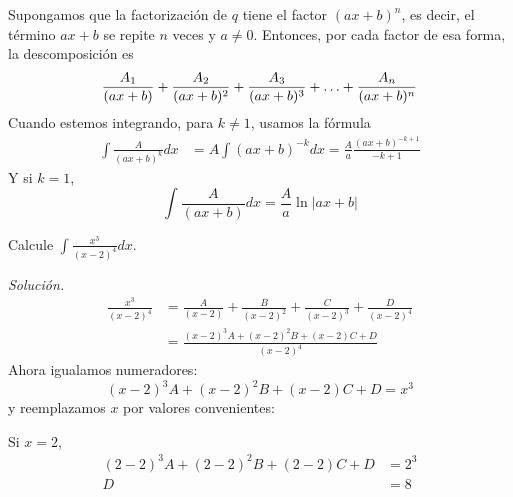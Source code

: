 Supongamos que la factorización de $q$ tiene el factor $(ax+b)^n$, es decir, el término $ax+b$ se repite $n$ veces y $a\ne0$. Entonces, por cada factor de esa forma, la descomposición es
\[
  \frac{A_{1}}{(ax+b)}+\frac{A_{2}}{(ax+b)^{2}}+\frac{%
  A_{3}}{(ax+b)^{3}}+\ldots+\frac{A_{n}}{(ax+b)^{n}}
\]
Cuando estemos integrando, para $k\ne 1$, usamos la fórmula
\begin{align*}
  \int \frac{A}{(ax+b)^{k}}dx&=A\int (ax+b)^{-k}dx
  =\frac{A}{a}\frac{(ax+b)^{-k+1}}{-k+1}
\end{align*}
Y si $k= 1$,
\[
  \int \frac{A}{\left( ax+b\right)}dx=\frac{A}{a}\ln\vert ax+b\vert
\]
\begin{ejemplo}
  Calcule $\int \frac{x^{3}}{(x-2)^{4}}dx$.
\end{ejemplo}
\emph{Solución.} 
\begin{align*}
  \frac{x^{3}}{(x-2)^{4}}&=\frac{A}{(x-2)}+\frac{B}{(x-2)^{2}}+%
  \frac{C}{(x-2)^{3}}+\frac{D}{(x-2)^{4}} \\
  &=\frac{(x-2)^{3}A+(x-2)^{2}B+(x-2)C+D}{(x-2)^{4}}
\end{align*}
Ahora igualamos numeradores:
\begin{equation}\label{Ejem2Fracc}
  (x-2)^{3}A+(x-2)^{2}B+(x-2)C+D=x^{3}
\end{equation}
y reemplazamos $x$ por valores convenientes:

Si $x=2$,
\begin{align*}
  (2-2)^{3}A+(2-2)^{2}B+(2-2)C+D&=2^{3} \\
  D&=8
\end{align*}

